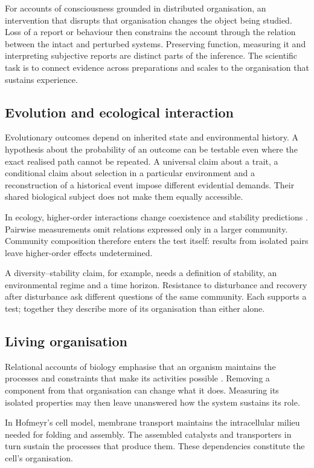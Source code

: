 \documentclass[10pt,twocolumn]{article}
\begin{document}
For accounts of consciousness grounded in distributed organisation, an intervention that disrupts that organisation changes the object being studied. Loss of a report or behaviour then constrains the account through the relation between the intact and perturbed systems. Preserving function, measuring it and interpreting subjective reports are distinct parts of the inference. The scientific task is to connect evidence across preparations and scales to the organisation that sustains experience.

\subsection{Evolution and ecological interaction}

Evolutionary outcomes depend on inherited state and environmental history. A hypothesis about the probability of an outcome can be testable even where the exact realised path cannot be repeated. A universal claim about a trait, a conditional claim about selection in a particular environment and a reconstruction of a historical event impose different evidential demands. Their shared biological subject does not make them equally accessible.

In ecology, higher-order interactions change coexistence and stability predictions \citep{bairey2016,grilli2017}. Pairwise measurements omit relations expressed only in a larger community. Community composition therefore enters the test itself: results from isolated pairs leave higher-order effects undetermined.

A diversity--stability claim, for example, needs a definition of stability, an environmental regime and a time horizon. Resistance to disturbance and recovery after disturbance ask different questions of the same community. Each supports a test; together they describe more of its organisation than either alone.

\subsection{Living organisation}

Relational accounts of biology emphasise that an organism maintains the processes and constraints that make its activities possible \citep{louie2020,hofmeyr2021}. Removing a component from that organisation can change what it does. Measuring its isolated properties may then leave unanswered how the system sustains its role.

In Hofmeyr's cell model, membrane transport maintains the intracellular milieu needed for folding and assembly. The assembled catalysts and transporters in turn sustain the processes that produce them. These dependencies constitute the cell's organisation.
\end{document}
